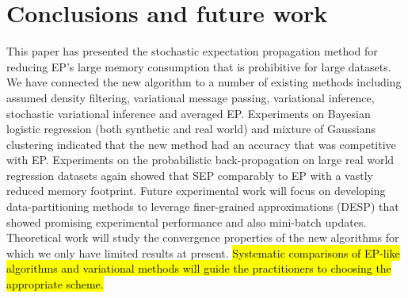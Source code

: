 \section{Conclusions and future work}
This paper has presented the stochastic expectation propagation method for reducing EP's large memory consumption that is prohibitive for large datasets. We have connected the new algorithm to a number of existing methods including assumed density filtering, variational message passing, variational inference, stochastic variational inference and averaged EP.
%
Experiments on Bayesian logistic regression (both synthetic and real world) and mixture of Gaussians clustering indicated that the new method had an accuracy that was competitive with EP.  Experiments on the probabilistic back-propagation on large real world regression datasets again showed that SEP comparably to EP with a vastly reduced memory footprint. 
%
Future experimental work will focus on developing data-partitioning methods to leverage finer-grained approximations (DESP) that showed promising experimental performance and also mini-batch updates. Theoretical work will study the convergence properties of the new algorithms for which we only have limited results at present. \hl{Systematic comparisons of EP-like algorithms and variational methods will guide the practitioners to choosing the appropriate scheme.}

